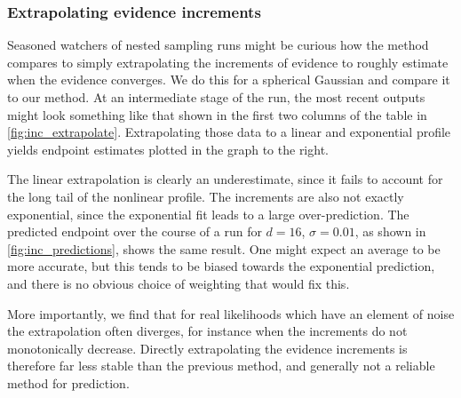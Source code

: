 \documentclass[usenatbib]{mnras}
\begin{document}
\subsubsection{Extrapolating evidence increments}
Seasoned watchers of nested sampling runs might be curious how the method compares to simply extrapolating the increments of evidence to roughly estimate when the evidence converges. We do this for a spherical Gaussian and compare it to our method. At an intermediate stage of the run, the most recent outputs might look something like that shown in the first two columns of the table in \cref{fig:inc_extrapolate}. Extrapolating those data to a linear and exponential profile yields endpoint estimates plotted in the graph to the right. 
\par
The linear extrapolation is clearly an underestimate, since it fails to account for the long tail of the nonlinear profile. The increments are also not exactly exponential, since the exponential fit leads to a large over-prediction. The predicted endpoint over the course of a run for $d = 16$, $\sigma = 0.01$, as shown in \cref{fig:inc_predictions}, shows the same result. One might expect an average to be more accurate, but this tends to be biased towards the exponential prediction, and there is no obvious choice of weighting that would fix this.
\par
More importantly, we find that for real likelihoods which have an element of noise the extrapolation often diverges, for instance when the increments do not monotonically decrease. Directly extrapolating the evidence increments is therefore far less stable than the previous method, and generally not a reliable method for prediction.
\end{document}
